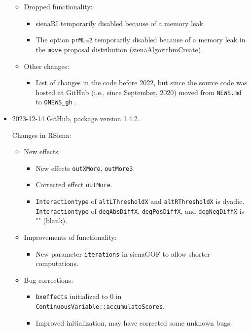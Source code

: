 \documentclass[a4paper,fleqn,11pt]{article}
\newcommand{\+}{\, + \,}
\newcommand{\sfn}[1]{\textsf{#1}}
\begin{document}
\begin{small}
\begin{itemize}
\begin{itemize}
\item Dropped functionality:
   \begin{itemize}
  \item \sfn{sienaRI}  temporarily disabled because of a memory leak.
  \item The option \texttt{prML=2}  temporarily disabled because of a memory leak in the
    \texttt{move}  proposal distribution (\sfn{sienaAlgorithmCreate}).
  \end{itemize}
\item Other changes:
   \begin{itemize}
  \item List of changes in the code before 2022, but since the source
  code was hosted at GitHub (i.e., since September, 2020) moved from
  \texttt{NEWS.md}  to \texttt{ONEWS\_gh} .
  \end{itemize}
\end{itemize}


\item 2023-12-14 GitHub, package version 1.4.2.

Changes in RSiena:
\begin{itemize}
\item New effects:
   \begin{itemize}
   \item New effects \texttt{outXMore}, \texttt{outMore3}.
   \item Corrected effect \texttt{outMore}.
   \item \texttt{Interactiontype} of \texttt{altLThresholdX} and
        \texttt{altRThresholdX} is dyadic.\\
        \texttt{Interactiontype} of \texttt{degAbsDiffX}, \texttt{degPosDiffX},
       and \texttt{degNegDiffX} is "" (blank).
    \end{itemize}
\item Improvements of functionality:
   \begin{itemize}
   \item New parameter \texttt{iterations} in \sfn{sienaGOF} to allow shorter computations.
    \end{itemize}
\item Bug corrections:
   \begin{itemize}
    \item  \texttt{bxeffects} initialized to 0 in \texttt{ContinuousVariable::accumulateScores}.
    \item Improved initialization, may have corrected some unknown bugs.
    \end{itemize}
\end{itemize}


\end{itemize}
\end{small}
\end{document}
